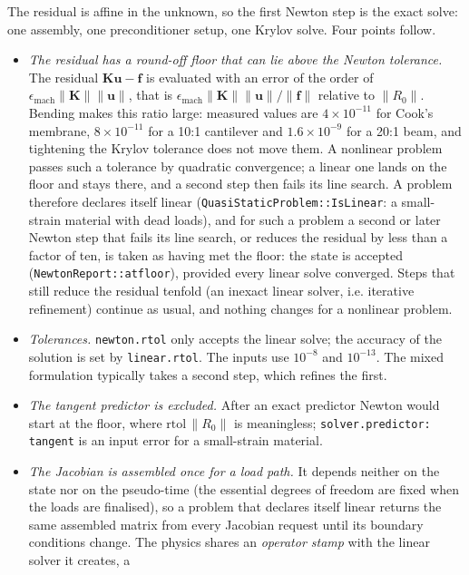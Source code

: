 \documentclass[11pt]{article}
\newcommand{\bu}{\bm{u}}
\newcommand{\bK}{\bm{K}}
\DeclareRobustCommand{\code}[1]{{\def\_{\textunderscore\allowbreak}\texttt{#1}}}
\begin{document}
The residual is affine in the unknown, so the first Newton step is the exact
solve: one assembly, one preconditioner setup, one Krylov solve.  Four
points follow.
\begin{itemize}[nosep]
  \item \emph{The residual has a round-off floor that can lie above the
    Newton tolerance.}  The residual $\bK\bu - \bm f$ is evaluated with an
    error of the order of $\epsilon_{\mathrm{mach}}\|\bK\|\|\bu\|$, that is
    $\epsilon_{\mathrm{mach}}\|\bK\|\|\bu\|/\|\bm f\|$ relative to
    $\|R_0\|$.  Bending makes this ratio large: measured values are
    $4\times10^{-11}$ for Cook's membrane, $8\times10^{-11}$ for a 10:1
    cantilever and $1.6\times10^{-9}$ for a 20:1 beam, and tightening the
    Krylov tolerance does not move them.  A nonlinear problem passes such a
    tolerance by quadratic convergence; a linear one lands on the floor and
    stays there, and a second step then fails its line search.  A problem
    therefore declares itself linear (\code{QuasiStaticProblem::IsLinear}:
    a small-strain material with dead loads), and for such a problem a second
    or later Newton step that fails its line search, or reduces the residual
    by less than a factor of ten, is taken as having met the floor: the
    state is accepted (\code{NewtonReport::at\_floor}), provided every
    linear solve converged.  Steps that still reduce the residual tenfold
    (an inexact linear solver, i.e. iterative refinement) continue as usual,
    and nothing changes for a nonlinear problem.
  \item \emph{Tolerances.}  \code{newton.rtol} only accepts the linear solve;
    the accuracy of the solution is set by \code{linear.rtol}.  The inputs
    use $10^{-8}$ and $10^{-13}$.  The mixed formulation typically takes a
    second step, which refines the first.
  \item \emph{The tangent predictor is excluded.}  After an exact predictor
    Newton would start at the floor, where $\text{rtol}\,\|R_0\|$ is
    meaningless; \code{solver.predictor: tangent} is an input error for a
    small-strain material.
  \item \emph{The Jacobian is assembled once for a load path.}  It depends
    neither on the state nor on the pseudo-time (the essential degrees of
    freedom are fixed when the loads are finalised), so a problem that
    declares itself linear returns the same assembled matrix from every
    Jacobian request until its boundary conditions change.  The physics
    shares an \emph{operator stamp} with the linear solver it creates, a

\end{itemize}
\end{document}
